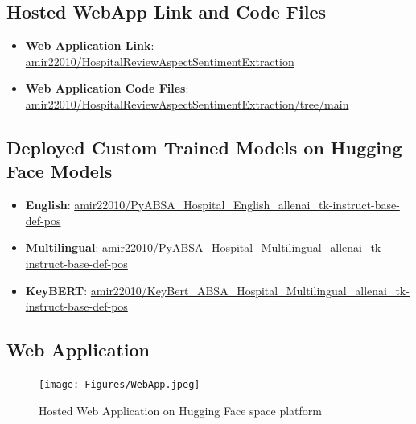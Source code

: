 \subsection{Hosted WebApp Link and Code Files}
\begin{itemize}
\item \textbf{Web Application Link}: 
\href{https://huggingface.co/spaces/amir22010/HospitalReviewAspectSentimentExtraction}{amir22010/HospitalReviewAspectSentimentExtraction}
\item \textbf{Web Application Code Files}: 
\href{https://huggingface.co/spaces/amir22010/HospitalReviewAspectSentimentExtraction/tree/main}{amir22010/HospitalReviewAspectSentimentExtraction/tree/main}
\end{itemize}
\subsection{Deployed Custom Trained Models on Hugging Face Models}
\begin{itemize}
\item \textbf{English}: 
\href{https://huggingface.co/amir22010/PyABSA_Hospital_English_allenai_tk-instruct-base-def-pos_FinedTuned_Model}{amir22010/PyABSA\_Hospital\_English\_allenai\_tk-instruct-base-def-pos}
\item \textbf{Multilingual}: 
\href{https://huggingface.co/amir22010/PyABSA_Hospital_Multilingual_allenai_tk-instruct-base-def-pos_FinedTuned_Model}{amir22010/PyABSA\_Hospital\_Multilingual\_allenai\_tk-instruct-base-def-pos}
\item \textbf{KeyBERT}: 
\href{https://huggingface.co/amir22010/KeyBert_ABSA_Hospital_Multilingual_allenai_tk-instruct-base-def-pos_FinedTuned_Model}{amir22010/KeyBert\_ABSA\_Hospital\_Multilingual\_allenai\_tk-instruct-base-def-pos}
\end{itemize}
\subsection{Web Application}
\begin{figure}
    \centering
    \texttt{[image: Figures/WebApp.jpeg]}
    \caption{Hosted Web Application on Hugging Face space platform}
    \label{fig:myfig3}
  \end{figure}
\clearpage
